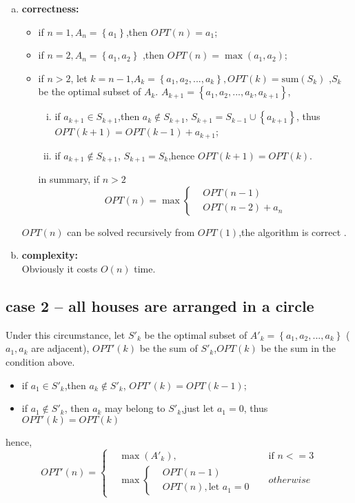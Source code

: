 \begin{enumerate}[a).]
\item \textbf{correctness:}
\begin{itemize}
	\item if $n = 1,A_n = \left\lbrace a_1\right\rbrace$,then $OPT(n) = a_1$;
	\item if $n = 2,A_n = \left\lbrace a_1,a_2\right\rbrace$ ,then $OPT(n) = \max(a_1,a_2)$;
	\item if $n > 2$, let $k=n-1$,$A_k =\left\lbrace a_1,a_2,...,a_k\right\rbrace, OPT(k) = \text{sum}(S_k)$ ,$S_k$ be the
	optimal subset of $A_k$.
	$A_{k+1} =\left\lbrace a_1,a_2,...,a_k,a_{k+1}\right\rbrace$, 
	\begin{enumerate}[i.]
		\item 	if $a_{k+1} \in S_{k+1}$,then  $a_k \notin S_{k+1}$,
		$S_{k+1} = S_{k-1}\cup \left\lbrace a_{k+1}\right\rbrace $,
		thus $OPT(k+1) = OPT(k-1) + a_{k+1}$;
		\item 	if $a_{k+1} \notin S_{k+1}$, $S_{k+1} = S_{k}$,hence $OPT(k+1) = OPT(k)$.
	\end{enumerate}
	in summary, if $n > 2$
	\[
		OPT(n) = \max \left\lbrace \begin{split} 
		&OPT(n-1) \\
		&OPT(n-2) + a_{n}
		\end{split} \right .
	\]	
\end{itemize}
	$OPT(n)$ can be solved recursively from $OPT(1)$,the algorithm is correct .

\item \textbf{complexity:}\\	
	Obviously it costs $O(n)$ time.
	
	
\end{enumerate}

\subsection{case 2 -- all houses are arranged in a circle}
Under this circumstance, let $S'_k$ be the optimal subset of $A'_k = \left\lbrace a_1,a_2,...,a_k\right\rbrace$
($a_1,a_k$ are adjacent),
$OPT'(k)$ be the sum of $S'_k$,$OPT(k)$ be the sum in the condition above.
\begin{itemize}
	\item if $a_1 \in S'_k$,then $a_k \notin S'_k$, $OPT'(k) = OPT(k-1)$;
	\item if $a_1 \notin S'_k$, then $a_k$ may belong to $S'_k$,just let $a_1 = 0$,
		 thus $OPT'(k) = OPT(k)$
\end{itemize}
hence,
\[
	OPT'(n) = \left\lbrace \begin{split} 
	&\max(A'_k),&\text{if } n <=3 \\
	 &\max \left\lbrace
	 \begin{split} 
	&OPT(n-1) &\\
	&OPT(n),\text{let } a_1 = 0
	\end{split} \right. &otherwise
	\end{split}\right.
\]



